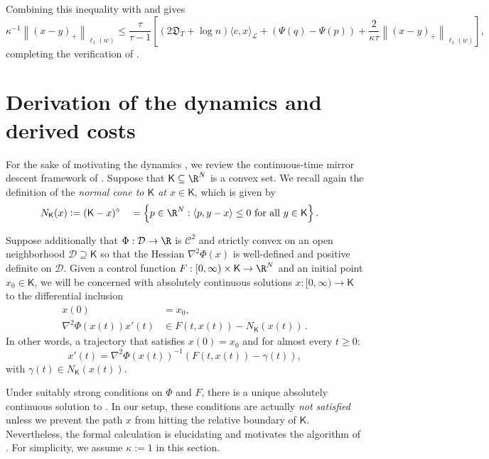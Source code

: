 \documentclass{toc}
\newcommand{\calC}{\mathcal C}
\newcommand{\calD}{\mathcal D}
\newcommand{\calL}{\mathcal L}
\newcommand{\depth}{\mathfrak{D}}
\newcommand{\seteq}{\mathrel{\mathop:}=}
\newcommand{\sfK}{\mathsf K}
\newcommand{\llangle}{\left\langle}
\newcommand{\rrangle}{\right\rangle}
\begin{document}
Combining this inequality with  and  gives
\begin{equation}\label{eq:mvmt3}
\kappa^{-1} \left\|\left(x-y\right)_+\right\|_{\ell_1(w)} 
\leq \frac{\tau}{\tau-1}\left[
\left(2\depth_T + \log n\right) \langle c,x\rangle_{\calL} + \left(\Psi(q)-\Psi(p)\right) 
+ \frac{2}{\kappa\tau} \left\|\left(x-y\right)_+\right\|_{\ell_1(w)}\right],
\end{equation}
completing the verification of .



\section{Derivation of the dynamics and derived costs}
\label{sec:derivation}


For the sake of motivating the dynamics , we review the
continuous-time mirror descent framework of \cite{BCLLM18}.
Suppose that $\sfK \subseteq \R^N$ is a convex set.
We recall again the definition of the \emph{normal cone to 
	$\sfK$ at $x \in \sfK$}, which is given by
\begin{alignat*}{3}
N_{\sfK}(x) &\seteq (\sfK-x)^{\circ} &&= \left\{ p \in \R^N : \llangle p,y-x\rrangle \leq 0 \textrm{ for all } y \in \sfK\right\}.
\end{alignat*}

Suppose additionally that $\Phi : \calD \to \R$
is $\calC^2$ and strictly convex on an open neighborhood $\calD \supseteq \sfK$ so that
the Hessian $\nabla^2 \Phi(x)$ is well-defined and positive definite on $\calD$.
Given a control function $F : [0,\infty) \times \sfK \to \R^N$ and an initial point $x_0 \in \sfK$, we will be concerned
with absolutely continuous solutions $x : [0,\infty) \to \sfK$ to the differential inclusion
\begin{align*}
x(0) &= x_0, \\
\nabla^2 \Phi(x(t)) x'(t) &\in F(t,x(t)) - N_{\sfK}(x(t))\,.
\end{align*}
In other words, a trajectory that satisfies $x(0) = x_0$ and
for almost every $t \geq 0$:
\begin{equation}\label{eq:mirror}
x'(t) = \nabla^2 \Phi(x(t))^{-1} \left(F(t,x(t)) - \gamma(t)\right),
\end{equation}
with $\gamma(t) \in N_{\sfK}(x(t))$.

Under suitably strong conditions on $\Phi$ and $F$, there is a unique absolutely continuous
solution to  \cite{BCLLM18}.
In our setup, these conditions are actually \emph{not satisfied} unless we prevent the path $x$ from hitting the relative boundary of $\sfK$.
Nevertheless, the formal calculation is elucidating and motivates the algorithm of . For simplicity, we assume $\kappa:=1$ in this section.
\end{document}
